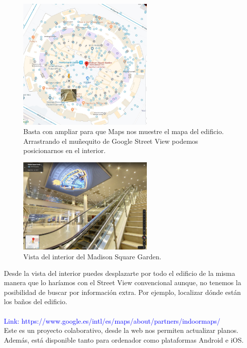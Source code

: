 \documentclass{article}
\begin{document}
		 \begin{figure}[h!]
			\centering
			\includegraphics[width=0.6\textwidth]{MadSq2}
			\caption{Basta con ampliar para que Maps nos muestre el mapa del edificio. Arrastrando el muñequito de Google Street View podemos posicionarnos en el interior.}
			\label{fig:ejemplo}
		\end{figure}
		
		 \begin{figure}[h!]
			\centering
			\includegraphics[width=0.6\textwidth]{MadSq3}
			\caption{Vista del interior del Madison Square Garden. }
			\label{fig:ejemplo}
		\end{figure}
	
		Desde la vista del interior puedes desplazarte por todo el edificio de la misma manera que lo haríamos con el Street View convencional aunque, no tenemos la posibilidad de buscar por información extra. Por ejemplo, localizar dónde están los baños del edificio.
		\\
		\\
		\textcolor{blue}{Link: https://www.google.es/intl/es/maps/about/partners/indoormaps/}		
		\\
		Este es un proyecto colaborativo, desde la web nos permiten actualizar planos. Además, está disponible tanto para ordenador como plataformas Android e iOS. 
	
\end{document}
